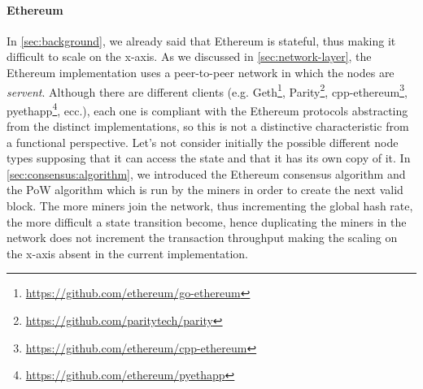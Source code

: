 \paragraph{Ethereum}
In \autoref{sec:background}, we already said that Ethereum is stateful, thus
making it difficult to scale on the x-axis. As we discussed in
\autoref{sec:network-layer}, the Ethereum implementation uses a peer-to-peer
network in which the nodes are \emph{servent}. Although there are different
clients (e.g. Geth\footnote{\url{https://github.com/ethereum/go-ethereum}},
Parity\footnote{\url{https://github.com/paritytech/parity}},
cpp-ethereum\footnote{\url{https://github.com/ethereum/cpp-ethereum}},
pyethapp\footnote{\url{https://github.com/ethereum/pyethapp}}, ecc.), each one
is compliant with the Ethereum protocols abstracting from the distinct
implementations, so this is not a distinctive characteristic from a functional
perspective. Let's not consider initially the possible different node types
 supposing that it can access the state and that it has its
own copy of it. In \autoref{sec:consensus:algorithm}, we introduced the Ethereum
consensus algorithm and the PoW algorithm which is run by the miners in order to
create the next valid block. The more miners join the network, thus incrementing
the global hash rate, the more difficult a state transition become, hence
duplicating the miners in the network does not increment the transaction
throughput making the scaling on the x-axis absent in the current
implementation.




